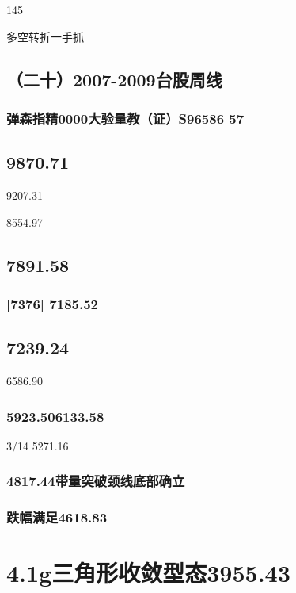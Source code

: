 \documentclass{article}
\begin{document}
145

\clearpage

多空转折一手抓

\subsection{（二十）2007-2009台股周线}

\subsubsection{弹森指精0000大验量教（证）S96586 57}

\subsection{9870.71}

9207.31

8554.97

\subsection{7891.58}

\subsubsection{[7376] 7185.52}

\subsection{7239.24}

6586.90

\subsubsection{5923.506133.58}

3/14 5271.16

\subsubsection{4817.44带量突破颈线底部确立}

\subsubsection{跌幅满足4618.83}

\section{4.1g三角形收敛型态3955.43}
\end{document}
